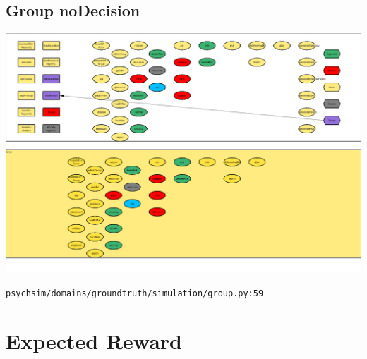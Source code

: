 \documentclass{article}%
\begin{document}
\subsection{Group noDecision}%
\label{subsec:Group noDecision}%
\includegraphics[width=\textwidth]{images/Group-noDecision.png}%
\begin{flushleft}%
\verb|psychsim/domains/groundtruth/simulation/group.py:59|%
\end{flushleft}

%
\section{Expected Reward}%
\label{sec:Expected Reward}%
\end{document}
